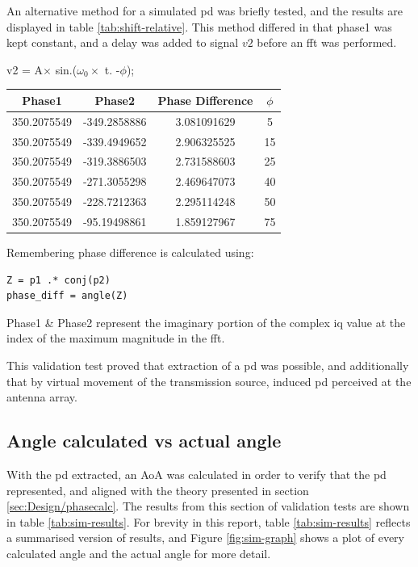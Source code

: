 \documentclass[class=report,11pt,crop=false]{standalone}
\begin{document}
An alternative method for a simulated \gls{pd} was briefly tested, and the results are displayed in table \ref{tab:shift-relative}. This method differed in that phase1 was kept constant, and a delay was added to signal $v2$ before an \gls{fft} was performed.

\begin{center}
    v2 = A$\times$ sin.($\omega_0 \times $ t. -$\phi$);
\end{center}

\begin{center}
\begin{tabular}{c|c|c|c}\centering
    \textbf{Phase1} & \textbf{Phase2} & \textbf{Phase Difference} & \textbf{$\phi $}  \\
    \hline
    350.2075549 & -349.2858886 & 3.081091629 & 5\\
    350.2075549 & -339.4949652 & 2.906325525 & 15 \\
    350.2075549 & -319.3886503 & 2.731588603 & 25\\
    350.2075549 & -271.3055298 & 2.469647073 & 40\\
    350.2075549 & -228.7212363 & 2.295114248 & 50\\
    350.2075549 & -95.19498861 & 1.859127967 & 75\\
\end{tabular}
\end{center}

\newpage
Remembering phase difference is calculated using:
\begin{lstlisting}
Z = p1 .* conj(p2)
phase_diff = angle(Z)
\end{lstlisting}

Phase1 \& Phase2 represent the imaginary portion of the complex \gls{iq} value at the index of the maximum magnitude in the \gls{fft}.

This validation test proved that extraction of a \gls{pd} was possible, and additionally that by virtual movement of the transmission source, induced \gls{pd} perceived at the antenna array. 

\subsection{Angle calculated vs actual angle}
With the \gls{pd} extracted, an \gls{AoA} was calculated in order to verify that the \gls{pd} represented, and aligned with the theory presented in section \ref{sec:Design/phasecalc}. The results from this section of validation tests are shown in table \ref{tab:sim-results}. For brevity in this report, table \ref{tab:sim-results} reflects a summarised version of results, and Figure \ref{fig:sim-graph} shows a plot of every calculated angle and the actual angle for more detail. 
\end{document}
